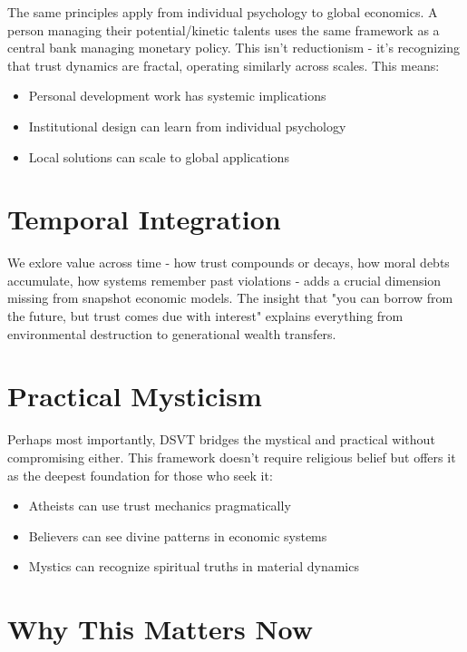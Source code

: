 \documentclass[11pt,oneside]{book}
\begin{document}
The same principles apply from individual psychology to global economics. A person managing their potential/kinetic talents uses the same framework as a central bank managing monetary policy. This isn't reductionism - it's recognizing that trust dynamics are fractal, operating similarly across scales. This means:

\begin{itemize}
\item Personal development work has systemic implications
\item Institutional design can learn from individual psychology
\item Local solutions can scale to global applications
\end{itemize}

\section*{Temporal Integration}

We exlore value across time - how trust compounds or decays, how moral debts accumulate, how systems remember past violations - adds a crucial dimension missing from snapshot economic models. The insight that "you can borrow from the future, but trust comes due with interest" explains everything from environmental destruction to generational wealth transfers.

\section*{Practical Mysticism}

Perhaps most importantly, DSVT bridges the mystical and practical without compromising either. This framework doesn't require religious belief but offers it as the deepest foundation for those who seek it:

\begin{itemize}
\item Atheists can use trust mechanics pragmatically
\item Believers can see divine patterns in economic systems
\item Mystics can recognize spiritual truths in material dynamics
\end{itemize}

\section*{Why This Matters Now}
\end{document}
